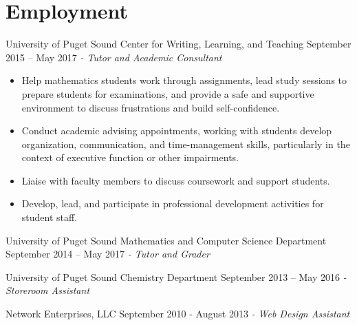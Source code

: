 \section{Employment}
University of Puget Sound Center for Writing, Learning, and Teaching \hfill September 2015 – May 2017 \newline 
\textit{ - Tutor and Academic Consultant}  \\
 \vspace{-4.5mm}
 \begin{itemize}
 \item Help mathematics students work through assignments, lead study sessions to prepare students for examinations, and provide a safe and supportive environment to discuss frustrations and build self-confidence.
 \item Conduct academic advising appointments, working with students develop organization, communication, and time-management skills, particularly in the context of executive function or other impairments.
 \item Liaise with faculty members to discuss coursework and support students.
 \item Develop, lead, and participate in professional development activities for student staff.
 \end{itemize}
\vspace{-3.5mm}
University of Puget Sound Mathematics and Computer Science Department \hfill  September 2014 – May 2017 \newline
\textit{- Tutor and Grader} \\
  \vspace{-4.5mm}
    \vspace{-3.5mm}
    
University of Puget Sound Chemistry Department \hfill September 2013 – May 2016 \newline 
\textit{- Storeroom Assistant} \\
  \vspace{-4.5mm}
    \vspace{-3.5mm}

Network Enterprises, LLC \hfill September 2010 - August 2013 \newline 
\textit{- Web Design Assistant} \hfill
    \vspace{-3.5mm}
